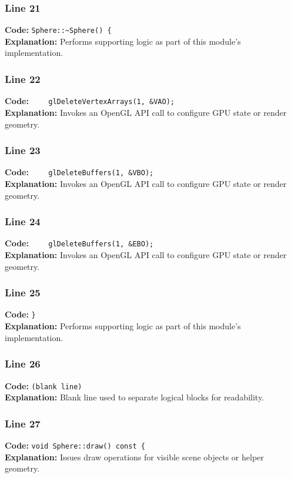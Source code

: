 \documentclass[11pt,a4paper]{article}
\begin{document}
\subsubsection*{Line 21}
\textbf{Code:} \verb|Sphere::~Sphere() {|\\
\textbf{Explanation:} Performs supporting logic as part of this module's implementation.

\subsubsection*{Line 22}
\textbf{Code:} \verb|    glDeleteVertexArrays(1, &VAO);|\\
\textbf{Explanation:} Invokes an OpenGL API call to configure GPU state or render geometry.

\subsubsection*{Line 23}
\textbf{Code:} \verb|    glDeleteBuffers(1, &VBO);|\\
\textbf{Explanation:} Invokes an OpenGL API call to configure GPU state or render geometry.

\subsubsection*{Line 24}
\textbf{Code:} \verb|    glDeleteBuffers(1, &EBO);|\\
\textbf{Explanation:} Invokes an OpenGL API call to configure GPU state or render geometry.

\subsubsection*{Line 25}
\textbf{Code:} \verb|}|\\
\textbf{Explanation:} Performs supporting logic as part of this module's implementation.

\subsubsection*{Line 26}
\textbf{Code:} \texttt{(blank line)}\\
\textbf{Explanation:} Blank line used to separate logical blocks for readability.

\subsubsection*{Line 27}
\textbf{Code:} \verb|void Sphere::draw() const {|\\
\textbf{Explanation:} Issues draw operations for visible scene objects or helper geometry.
\end{document}
